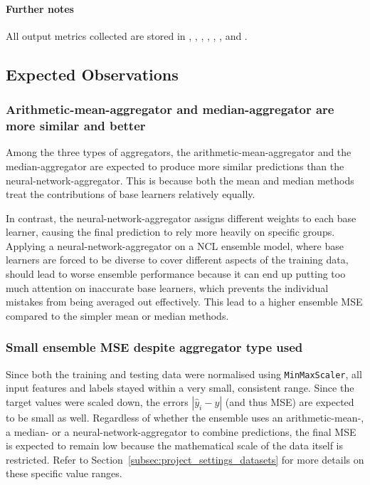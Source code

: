 \documentclass{article}
\begin{document}
\paragraph{Further notes}
All output metrics collected are stored in , , , , , ,  and . 


\subsection{Expected Observations}


\subsubsection{Arithmetic-mean-aggregator and median-aggregator are more similar and better}
Among the three types of aggregators, the arithmetic-mean-aggregator and the median-aggregator are expected to produce more similar predictions than the neural-network-aggregator. This is because both the mean and median methods treat the contributions of base learners relatively equally. 

In contrast, the neural-network-aggregator assigns different weights to each base learner, causing the final prediction to rely more heavily on specific groups. Applying a neural-network-aggregator on a NCL ensemble model, where base learners are forced to be diverse to cover different aspects of the training data, should lead to worse ensemble performance because it can end up putting too much attention on inaccurate base learners, which prevents the individual mistakes from being averaged out effectively. This lead to a higher ensemble MSE compared to the simpler mean or median methods. 


\subsubsection{Small ensemble MSE despite aggregator type used}
Since both the training and testing data were normalised using \texttt{MinMaxScaler}, all input features and labels stayed within a very small, consistent range. Since the target values were scaled down, the errors $\left|\hat{y}_i - y\right|$ (and thus MSE) are expected to be small as well. Regardless of whether the ensemble uses an arithmetic-mean-, a median- or a neural-network-aggregator to combine predictions, the final MSE is expected to remain low because the mathematical scale of the data itself is restricted. Refer to Section~\ref{subsec:project_settings_datasets} for more details on these specific value ranges. 
\end{document}
